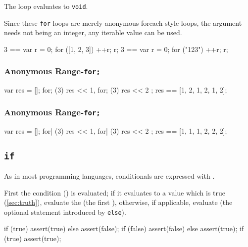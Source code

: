 
The loop evaluates to \lstinline{void}.

Since these \lstinline{for} loops are merely anonymous foreach-style loops,
the argument needs not being an integer, any iterable value can be used.

\begin{urbiassert}
3 == { var r = 0; for ([1, 2, 3]) ++r; r};
3 == { var r = 0; for ("123")     ++r; r};
\end{urbiassert}


\subsubsection{Anonymous Range-\lstinline{for;}}
\label{sec:lang:forn:semi}

\begin{urbiassert}
{
  var res = [];
  for; (3) res << 1, for; (3) res << 2 ;
  res
}
  == [1, 2, 1, 2, 1, 2];
\end{urbiassert}

\subsubsection{Anonymous Range-\lstinline{for;}}
\label{sec:lang:forn:pipe}

\begin{urbiassert}
{
  var res = [];
  for| (3) res << 1, for| (3) res << 2 ;
  res
}
  == [1, 1, 1, 2, 2, 2];
\end{urbiassert}

\subsection{\lstinline{if}}
\label{sec:lang:if}
As in most programming languages, conditionals are expressed with
.


First the condition () is evaluated; if it evaluates to a
value which is true (\autoref{sec:truth}), evaluate the 
(the first ), otherwise, if applicable, evaluate
 (the optional statement introduced by \lstinline{else}).

\begin{urbiscript}
if (true)  assert(true) else assert(false);
if (false) assert(false) else assert(true);
if (true)  assert(true);
\end{urbiscript}

